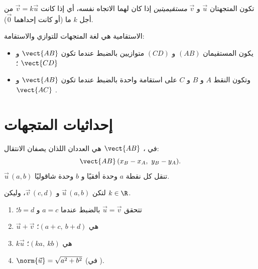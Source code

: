 \begin{definition}[الاستقامية]\label{def:g10:vectors:collinear}
تكون المتجهتان $\vec u$ و $\vec v$
\emph{مستقيميتين} إذا كان لهما الاتجاه
نفسه، أي إذا كانت $\vec v = k \vec u$ من أجل  $k$ ما (أو كانت
إحداهما $\vec 0$).
\end{definition}

\begin{remark}
الاستقامية هي لغة المتجهات للتوازي والاستقامة:
\begin{itemize}
  \item يكون المستقيمان $(AB)$ و $(CD)$ متوازيين بالضبط عندما تكون $\vect{AB}$
        و $\vect{CD}$ ؛
  \item وتكون النقط $A$ و $B$ و $C$ على استقامة واحدة بالضبط عندما تكون $\vect{AB}$ و
        $\vect{AC}$ .
\end{itemize}
\end{remark}

\section{إحداثيات المتجهات}

\begin{definition}\label{def:g10:vectors:coords}
في ، \emph{}  $\vect{AB}$
هي العددان اللذان يصفان الانتقال:
\[
\vect{AB}\,(x_B - x_A,\ y_B - y_A).
\]
 $\vec u\,(a, b)$ تنقل كل نقطة $a$ وحدة أفقيًا و
$b$ وحدة شاقوليًا.
\end{definition}

\begin{proposition}\label{prop:g10:vectors:coordrules}
لتكن $\vec u\,(a, b)$ و $\vec v\,(c, d)$، وليكن $k \in \R$.
\begin{enumerate}
  \item تتحقق $\vec u = \vec v$ بالضبط عندما $a = c$ و $b = d$؛
  \item {} $\vec u + \vec v$ هي $(a + c,\ b + d)$؛
  \item {} $k\vec u$ هي $(ka,\ kb)$؛
  \item $\norm{\vec u} = \sqrt{a^2 + b^2}$ (في ).
\end{enumerate}
\end{proposition}

